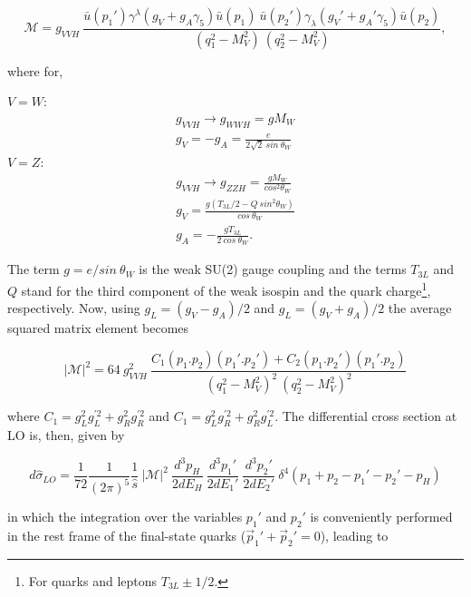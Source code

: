 \begin{equation}
\mathcal{M} = g_{VVH}~\frac{\bar{u}(p_{1}')\gamma^{\lambda}(g_{V}+g_{A}\gamma_{5})\bar{u}(p_{1})~\bar{u}(p_{2}')\gamma_{\lambda}(g_{V}'+g_{A}'\gamma_{5})\bar{u}(p_{2})}{(q_{1}^{2}-M_{V}^{2})~(q_{2}^{2}-M_{V}^{2})},
\end{equation}

where for,

\begin{multicols}{2}
$V = W$:
\begin{eqnarray}
g_{VVH} \rightarrow g_{WWH} = gM_{W}\\
g_{V} = -g_{A} = \frac{e}{2\sqrt{2}~sin~\theta_{W}}
\end{eqnarray}
$V = Z$:
\begin{eqnarray}
g_{VVH} \rightarrow g_{ZZH} = \frac{gM_{W}}{cos^{2}\theta_{W}}\\
g_{V} = \frac{g(T_{3L}/2 - Q~sin^{2}\theta_{W})}{cos~\theta_{W}}\\
g_{A} = - \frac{gT_{3L}}{2~cos~\theta_{W}}.
\end{eqnarray}
\end{multicols}

The term $g = e/sin~\theta_{W}$ is the weak SU(2) gauge coupling and the terms $T_{3L}$ and $Q$ stand for the third component of the weak isospin and the quark charge\footnote{For quarks and leptons $T_{3L} \pm 1/2$.}, respectively. Now, using $g_{L} = (g_{V}-g_{A})/2$ and $g_{L} = (g_{V}+g_{A})/2$ the average squared matrix element becomes \cite{bib:PhysLettB136-3-1984,bib:PhysRep457-1-2005,bib:NuclPhysB287-1987}

\begin{equation}
|\mathcal{M}|^{2} = 64~g_{VVH}^{2}~\frac{C_{1}(p_{1}.p_{2})(p_{1}'.p_{2}') + C_{2}(p_{1}.p_{2}')(p_{1}'.p_{2})}{(q_{1}^{2}-M_{V}^{2})^{2}~(q_{2}^{2}-M_{V}^{2})^{2}}
\end{equation}

where $C_{1} = g_{L}^{2}g_{L}^{'2} + g_{R}^{2}g_{R}^{'2}$ and $C_{1} = g_{L}^{2}g_{R}^{'2} + g_{R}^{2}g_{L}^{'2}$. The differential cross section at LO is, then, given by \cite{bib:PhysRep457-1-2005}

\begin{equation}
d\hat{\sigma}_{LO} = \frac{1}{72}\frac{1}{(2\pi)^{5}}\frac{1}{\hat{s}}~|\mathcal{M}|^{2}~\frac{d^{3}p_{H}}{2dE_{H}}~\frac{d^{3}p_{1}'}{2dE_{1}'}~\frac{d^{3}p_{2}'}{2dE_{2}'}~\delta^{4}(p_{1}+p_{2}-p_{1}'-p_{2}'-p_{H})
\end{equation}

in which the integration over the variables $p_{1}'$ and $p_{2}'$ is conveniently performed in the rest frame of the final-state quarks ($\vec{p}_{1}' + \vec{p}_{2}' = 0$), leading to \cite{bib:PhysRep457-1-2005}

